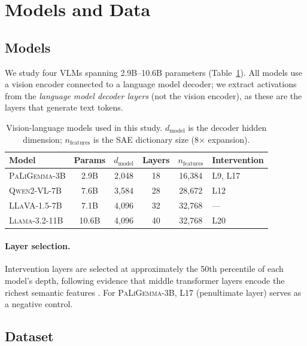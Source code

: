 \documentclass[11pt,a4paper]{article}
\newcommand{\modelname}[1]{\textsc{#1}}
\newcommand{\pali}{\modelname{PaLiGemma-3B}}
\newcommand{\qwen}{\modelname{Qwen2-VL-7B}}
\newcommand{\llama}{\modelname{Llama-3.2-11B}}
\newcommand{\llava}{\modelname{LLaVA-1.5-7B}}
\newcommand{\sae}{SAE}
\begin{document}
\section{Models and Data}
\label{sec:models}

\subsection{Models}

We study four VLMs spanning 2.9B--10.6B parameters (Table~\ref{tab:models}).
All models use a vision encoder connected to a language model decoder; we extract activations from the \emph{language model decoder layers} (not the vision encoder), as these are the layers that generate text tokens.

\begin{table}[h]
\centering
\small
\caption{Vision-language models used in this study. $d_{\text{model}}$ is the decoder hidden dimension; $n_{\text{features}}$ is the \sae{} dictionary size (8$\times$ expansion).}
\label{tab:models}
\begin{tabular}{@{}lccccl@{}}
\toprule
\textbf{Model} & \textbf{Params} & $d_{\text{model}}$ & \textbf{Layers} & $n_{\text{features}}$ & \textbf{Intervention} \\
\midrule
\pali{}    & 2.9B  & 2,048 & 18 & 16,384 & L9, L17 \\
\qwen{}    & 7.6B  & 3,584 & 28 & 28,672 & L12 \\
\llava{}   & 7.1B  & 4,096 & 32 & 32,768 & --- \\
\llama{}   & 10.6B & 4,096 & 40 & 32,768 & L20 \\
\bottomrule
\end{tabular}
\end{table}

\paragraph{Layer selection.}
Intervention layers are selected at approximately the 50th percentile of each model's depth, following evidence that middle transformer layers encode the richest semantic features \citep{cunningham2023sparse,templeton2024scaling}.
For \pali{}, L17 (penultimate layer) serves as a negative control.

\subsection{Dataset}
\end{document}

